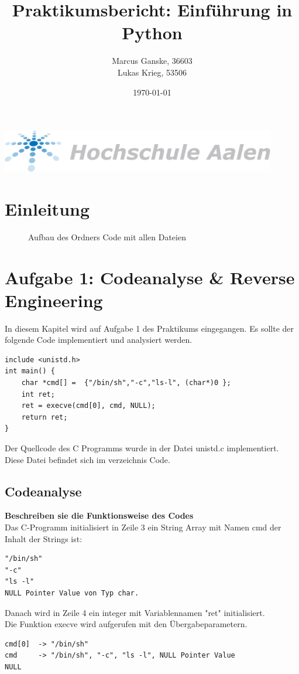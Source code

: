 \documentclass[12pt]{article}
\title{Praktikumsbericht: Einf\"uhrung in Python}
\author{Marcus Ganske, 36603\\
		Lukas Krieg, 53506}
\date{\today}
\begin{document}
\maketitle
\vspace{+8cm}{
}
\includegraphics[width=12cm]{Hochschule-aalen.pdf}

\newpage
\renewcommand\contentsname{Inhaltsverzeichnis}
\tableofcontents
\newpage
	
	\section{Einleitung}
	\begin{figure}[H]
	
		\caption{Aufbau des Ordners Code mit allen Dateien}
	\end{figure}	


\newpage
\section{Aufgabe 1: Codeanalyse \& Reverse Engineering}
In diesem Kapitel wird auf Aufgabe 1 des Praktikums eingegangen.
Es sollte der folgende Code implementiert und analysiert werden.
\begin{lstlisting}
include <unistd.h>
int main() {
	char *cmd[] =  {"/bin/sh","-c","ls-l", (char*)0 };
	int ret;
	ret = execve(cmd[0], cmd, NULL);
	return ret;
}
\end{lstlisting}

Der Quellcode des C Programms wurde in der Datei unistd.c implementiert.
Diese Datei befindet sich im verzeichnis Code.

\subsection{Codeanalyse}
\textbf{Beschreiben sie die Funktionsweise des Codes}\\
Das C-Programm initialisiert in Zeile 3 ein String Array mit Namen cmd der Inhalt der Strings ist: \\
\begin{lstlisting}
"/bin/sh"
"-c"
"ls -l"
NULL Pointer Value von Typ char.
\end{lstlisting}
Danach wird in Zeile 4 ein integer mit Variablennamen "ret" initialisiert.\\
Die Funktion execve wird aufgerufen mit den Übergabeparametern.
\begin{lstlisting}
cmd[0] 	-> "/bin/sh"
cmd		-> "/bin/sh", "-c", "ls -l", NULL Pointer Value
NULL	 
\end{lstlisting}
\end{document}
